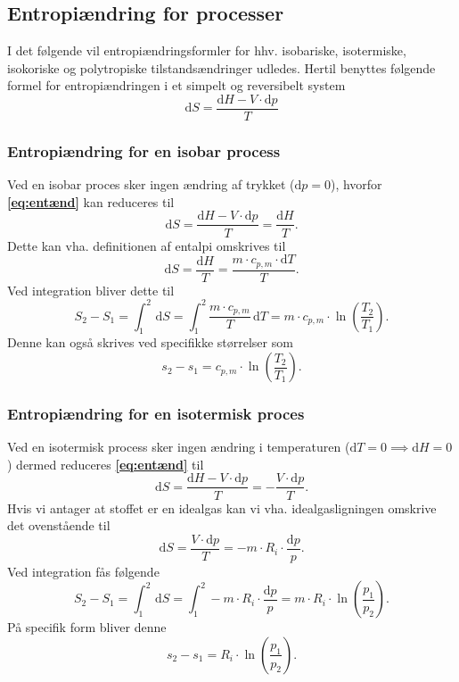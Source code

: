 \subsection{Entropiændring for processer}
I det følgende vil entropiændringsformler for hhv. isobariske, isotermiske, isokoriske og polytropiske tilstandsændringer udledes. Hertil benyttes følgende formel for entropiændringen i et simpelt og reversibelt system
\begin{equation}\label{eq:entænd}
  \mathrm{d}S = \frac{\mathrm{d}H - V \cdot \mathrm{d}p}{T}
\end{equation}

\subsubsection{Entropiændring for en isobar process}
Ved en isobar proces sker ingen ændring af trykket ($\mathrm{d}p = 0$), hvorfor \textbf{\autoref{eq:entænd}} kan reduceres til
\[ 
\mathrm{d}S = \frac{\mathrm{d}H - V \cdot \mathrm{d}p}{T} = \frac{\mathrm{d}H}{T}
.\]
Dette kan vha. definitionen af entalpi omskrives til
\[ 
\mathrm{d}S = \frac{\mathrm{d}H}{T} = \frac{m \cdot c_{p,m}\cdot \mathrm{d}T}{T}
.\]
Ved integration bliver dette til
\[ 
S_2 - S_1 = \int_{1}^{2} \, \mathrm{d}S = \int_{1}^{2} \frac{m \cdot c_{p,m}}{T} \, \mathrm{d}T = m \cdot c_{p,m} \cdot \ln \left( \frac{T_2}{T_1} \right)
.\]
Denne kan også skrives ved specifikke størrelser som
\[ 
s_2 - s_1 = c_{p,m}\cdot \ln \left( \frac{T_2}{T_1} \right)
.\]

\subsubsection{Entropiændring for en isotermisk proces}
Ved en isotermisk process sker ingen ændring i temperaturen ($\mathrm{d}T = 0 \implies \mathrm{d}H = 0$) dermed reduceres \textbf{\autoref{eq:entænd}} til
\[ 
\mathrm{d}S = \frac{\mathrm{d}H - V \cdot \mathrm{d}p}{T} = - \frac{V \cdot \mathrm{d}p}{T}
.\]
Hvis vi antager at stoffet er en idealgas kan vi vha. idealgasligningen omskrive det ovenstående til
\[ 
\mathrm{d}S = \frac{V\cdot \mathrm{d}p}{T} = - m \cdot R_i \cdot \frac{\mathrm{d}p}{p}
.\]
Ved integration fås følgende
\[ 
S_2 - S_1 = \int_{1}^{2} \, \mathrm{d}S = \int_{1}^{2} - m \cdot R_i \cdot \frac{\mathrm{d}p}{p} = m \cdot R_i \cdot \ln \left( \frac{p_1}{p_2} \right)
.\]
På specifik form bliver denne
\[ 
s_2 - s_1 = R_i \cdot \ln \left( \frac{p_1}{p_2} \right)
.\]

